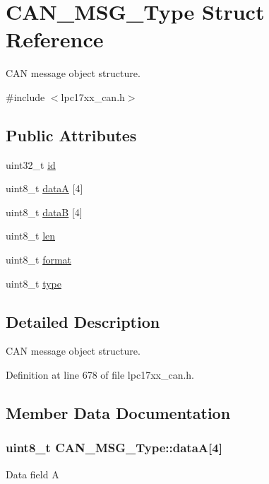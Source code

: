 \hypertarget{struct_c_a_n___m_s_g___type}{\section{\-C\-A\-N\-\_\-\-M\-S\-G\-\_\-\-Type \-Struct \-Reference}
\label{struct_c_a_n___m_s_g___type}
}


\-C\-A\-N message object structure.  




{\ttfamily \#include $<$lpc17xx\-\_\-can.\-h$>$}

\subsection*{\-Public \-Attributes}
\begin{DoxyCompactItemize}
\item 
uint32\-\_\-t \hyperlink{struct_c_a_n___m_s_g___type_a360b100656bd972200359eec9c047b90}{id}
\item 
uint8\-\_\-t \hyperlink{struct_c_a_n___m_s_g___type_a35b8264e40aaf0fba7fa7c0a2be7a3dc}{data\-A} \mbox{[}4\mbox{]}
\item 
uint8\-\_\-t \hyperlink{struct_c_a_n___m_s_g___type_a636a3396f3c986ebdd76090494a2c336}{data\-B} \mbox{[}4\mbox{]}
\item 
uint8\-\_\-t \hyperlink{struct_c_a_n___m_s_g___type_a2fcccafb45ef3e30053c8f54cbbe9818}{len}
\item 
uint8\-\_\-t \hyperlink{struct_c_a_n___m_s_g___type_a0800c2e8a71cb1de5fc426954adf1ec6}{format}
\item 
uint8\-\_\-t \hyperlink{struct_c_a_n___m_s_g___type_a451e6dea08cf629d0b027037291089aa}{type}
\end{DoxyCompactItemize}


\subsection{\-Detailed \-Description}
\-C\-A\-N message object structure. 

\-Definition at line 678 of file lpc17xx\-\_\-can.\-h.



\subsection{\-Member \-Data \-Documentation}
\hypertarget{struct_c_a_n___m_s_g___type_a35b8264e40aaf0fba7fa7c0a2be7a3dc}{
\subsubsection[{data\-A}]{\setlength{\rightskip}{0pt plus 5cm}uint8\-\_\-t {\bf \-C\-A\-N\-\_\-\-M\-S\-G\-\_\-\-Type\-::data\-A}\mbox{[}4\mbox{]}}}\label{struct_c_a_n___m_s_g___type_a35b8264e40aaf0fba7fa7c0a2be7a3dc}
\-Data field \-A 

